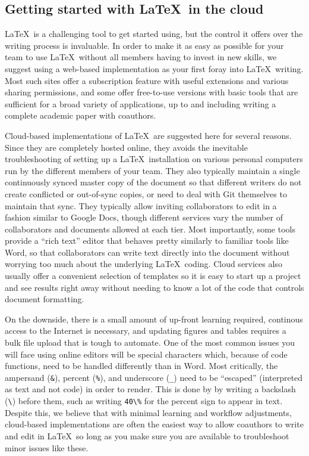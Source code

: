\subsection{Getting started with \LaTeX\ in the cloud}

\LaTeX\ is a challenging tool to get started using,
but the control it offers over the writing process is invaluable.
In order to make it as easy as possible for your team
to use \LaTeX\ without all members having to invest in new skills,
we suggest using a web-based implementation as your first foray into \LaTeX\ writing.
Most such sites offer a subscription feature with useful extensions and various sharing permissions,
and some offer free-to-use versions with basic tools that are sufficient
for a broad variety of applications,
up to and including writing a complete academic paper with coauthors.

Cloud-based implementations of \LaTeX\ are suggested here for several reasons.
Since they are completely hosted online,
they avoids the inevitable troubleshooting of setting up a \LaTeX\ installation
on various personal computers run by the different members of your team.
They also typically maintain a single continuously synced master copy of the document
so that different writers do not create conflicted or out-of-sync copies,
or need to deal with Git themselves to maintain that sync.
They typically allow inviting collaborators to edit in a fashion similar to Google Docs,
though different services vary the number of collaborators and documents allowed at each tier.
Most importantly, some tools provide a ``rich text'' editor
that behaves pretty similarly to familiar tools like Word,
so that collaborators can write text directly into the document without worrying too much
about the underlying \LaTeX\ coding.
Cloud services also usually offer a convenient selection of templates
so it is easy to start up a project and see results right away
without needing to know a lot of the code that controls document formatting.

On the downside, there is a small amount of up-front learning required,
continous access to the Internet is necessary,
and updating figures and tables requires a bulk file upload that is tough to automate.
One of the most common issues you will face using online editors will be special characters
which, because of code functions, need to be handled differently than in Word.
Most critically, the ampersand (\texttt{\&}), percent (\texttt{\%}), and underscore (\texttt{\_})
need to be ``escaped'' (interpreted as text and not code) in order to render.
This is done by by writing a backslash (\texttt{\textbackslash}) before them,
such as writing \texttt{40\textbackslash\%} for the percent sign to appear in text.
Despite this, we believe that with minimal learning and workflow adjustments,
cloud-based implementations are often the easiest way to allow coauthors to write and edit in \LaTeX\,
so long as you make sure you are available to troubleshoot minor issues like these.

